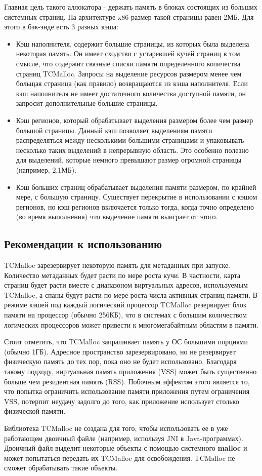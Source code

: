 Главная цель такого аллокатора - держать память в блоках состоящих из больших системных страниц. На архитектуре x86 размер такой страницы равен 2МБ. Для этого в бэк-энде есть 3 разных кэша:
\begin{itemize}
	\item Кэш наполнителя, содержит большие страницы, из которых была выделена некоторая память. Он имеет сходство с устаревшей кучей страниц в том смысле, что содержит связные списки памяти определенного количества страниц TCMalloc. Запросы на выделение ресурсов размером менее чем больщая страница (как правило) возвращаются из кэша наполнителя. Если кэш наполнителя не имеет достаточного количества доступной памяти, он запросит дополнительные большие страницы.
	\item Кэш регионов, который обрабатывает выделения размером более чем размер большой страницы. Данный кэш позволяет выделениям памяти распределяться между несколькими большими страницами и упаковывать несколько таких выделений в непрерывную область. Это особенно полезно для выделений, которые немного превышают размер огромной страницы (например, 2,1МБ).
	\item Кэш больших страниц обрабатывает выделения памяти размером, по крайней мере, с большую страницу. Существует перекрытие в использовании с кэшом регионов, но кэш регионов включается только тогда, когда точно определено (во время выполнения) что выделение памяти выиграет от этого.
\end{itemize}

\subsection{Рекомендации к использованию}

TCMalloc зарезервирует некоторую память для метаданных при запуске. Количество метаданных будет расти по мере роста кучи. В частности, карта страниц будет расти вместе с диапазоном виртуальных адресов, используемым TCMalloc, а спаны будут расти по мере роста числа активных страниц памяти. В режиме кэшей под каждый логический процессор TCMalloc резервирует блок памяти на процессор (обычно 256КБ), что в системах с большим количеством логических процессоров может привести к многомегабайтным областям в памяти.

Стоит отметить, что TCMalloc запрашивает память у ОС большими порциями (обычно 1ГБ). Адресное пространство зарезервировано, но не резервирует физическую память до тех пор, пока оно не будет использовано. Благодаря такому подходу, виртуальная память приложения (VSS) может быть существенно больше чем резидентная память (RSS). Побочным эффектом этого является то, что попытка ограничить использование памяти приложения путем ограничения VSS, потерпит неудачу задолго до того, как приложение использует столько физической памяти.

Библиотека TCMalloc не создана для того, чтобы использовать ее в уже работающем двоичный файле (например, используя JNI в Java-программах). Двоичный файл выделит некоторые объекты с помощью системного \textbf{malloc} и может попытаться передать их TCMalloc для освобождения. TCMalloc не сможет обрабатывать такие объекты.